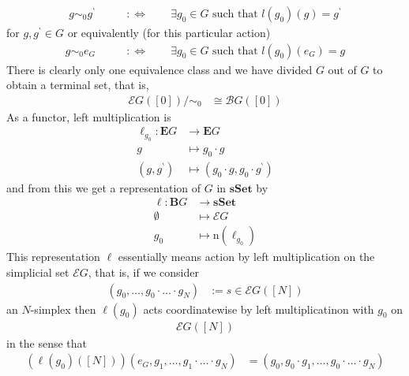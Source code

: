 \begin{align*}
  g
  \sim_{0}
  g^{\backprime}
  \qquad
  &:\Leftrightarrow
  \qquad
  \exists
  g_{0}
  \in
  G
  \text{ such that }
  l(g_{0})(g)
  =
  g^{\backprime}
\end{align*}
for $g,g^{\backprime} \in G$ or equivalently (for this particular action)
\begin{align*}
  g
  \sim_{0}
  e_{G}
  \qquad
  &:\Leftrightarrow
  \qquad
  \exists
  g_{0}
  \in
  G
  \text{ such that }
  l(g_{0})(e_{G})
  =
  g
\end{align*}
There is clearly only one equivalence class and we have divided $G$ out of $G$ to obtain a terminal set, that is,
\begin{align*}
  \mathcal{E}G
  \left(
    [0]
  \right)
  \slash
  \sim_{0}
  &\cong
  \mathcal{B}G
  \left(
    [0]
  \right)
\end{align*}
As a functor, left multiplication is
\begin{align*}
  \ell_{g_{0}}
  \colon
  \mathbf{E}G
  &\rightarrow
  \mathbf{E}G
  \\
  g
  &\mapsto
  g_{0}
  \cdot
  g
  \\
  \left(
    g,
    g^{\backprime}
  \right)
  &\mapsto
  \left(
    g_{0}
    \cdot
    g,
    g_{0}
    \cdot
    g^{\backprime}
  \right)
\end{align*}
and from this we get a representation of $G$ in $\mathbf{sSet}$ by
\begin{align*}
  \ell
  \colon
  \mathbf{B}G
  &\rightarrow
  \mathbf{sSet}
  \\
  \emptyset
  &\mapsto
  \mathcal{E}G
  \\
  g_{0}
  &\mapsto
  \mathrm{n}
  \left(
    \ell_{g_{0}}
  \right)
\end{align*}
This representation $\ell$ essentially means action by left multiplication on the simplicial set $\mathcal{E}G$, that is, if we consider
\begin{align*}
  \left(
    g_{0},
    \ldots,
    g_{0}
    \cdot
    \ldots
    \cdot
    g_{N}
  \right)
  &:=
  s
  \in
  \mathcal{E}G
  \left(
    [N]
  \right)
\end{align*}
an $N$-simplex then $\ell(g_{0})$ acts coordinatewise by left multiplicatinon with $g_{0}$ on
\begin{align*}
  \mathcal{E}G
  \left(
    [N]
  \right)
\end{align*}
in the sense that
\begin{align*}
  \left(
    \ell(g_{0})
    \left(
      [N]
    \right)
  \right)
  \left(
    e_{G},
    g_{1},
    \ldots,
    g_{1}
    \cdot
    \ldots
    \cdot
    g_{N}
  \right)
  &=
  \left(
    g_{0},
    g_{0}
    \cdot
    g_{1},
    \ldots,
    g_{0}
    \cdot
    \ldots
    \cdot
    g_{N}
  \right)
\end{align*}
